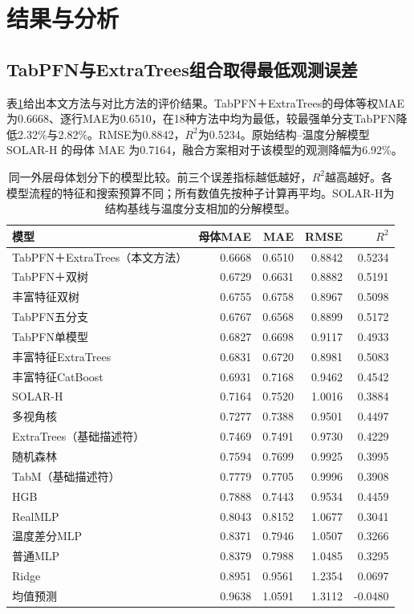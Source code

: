 \section{结果与分析}
\subsection{TabPFN与ExtraTrees组合取得最低观测误差}
表\ref{tab:newcomparison}给出本文方法与对比方法的评价结果。TabPFN＋ExtraTrees的母体等权MAE为0.6668、逐行MAE为0.6510，在18种方法中均为最低，较最强单分支TabPFN降低2.32\%与2.82\%。RMSE为0.8842，$R^2$为0.5234。原始结构--温度分解模型 SOLAR-H 的母体 MAE 为0.7164，融合方案相对于该模型的观测降幅为6.92\%。

\begin{table}[htbp]\centering\small
\caption{同一外层母体划分下的模型比较。前三个误差指标越低越好，$R^2$越高越好。各模型流程的特征和搜索预算不同；所有数值先按种子计算再平均。SOLAR-H为结构基线与温度分支相加的分解模型。}\label{tab:newcomparison}
\begin{tabular}{lrrrr}\toprule
模型 & 母体MAE & MAE & RMSE & $R^2$\\\midrule
TabPFN＋ExtraTrees（本文方法） & 0.6668 & 0.6510 & 0.8842 & 0.5234\\
TabPFN＋双树 & 0.6729 & 0.6631 & 0.8882 & 0.5191\\
丰富特征双树 & 0.6755 & 0.6758 & 0.8967 & 0.5098\\
TabPFN五分支 & 0.6767 & 0.6568 & 0.8899 & 0.5172\\
TabPFN单模型 & 0.6827 & 0.6698 & 0.9117 & 0.4933\\
丰富特征ExtraTrees & 0.6831 & 0.6720 & 0.8981 & 0.5083\\
丰富特征CatBoost & 0.6931 & 0.7168 & 0.9462 & 0.4542\\
SOLAR-H & 0.7164 & 0.7520 & 1.0016 & 0.3884\\
多视角核 & 0.7277 & 0.7388 & 0.9501 & 0.4497\\
ExtraTrees（基础描述符） & 0.7469 & 0.7491 & 0.9730 & 0.4229\\
随机森林 & 0.7594 & 0.7699 & 0.9925 & 0.3995\\
TabM（基础描述符） & 0.7779 & 0.7705 & 0.9996 & 0.3908\\
HGB & 0.7888 & 0.7443 & 0.9534 & 0.4459\\
RealMLP & 0.8043 & 0.8152 & 1.0677 & 0.3041\\
温度差分MLP & 0.8371 & 0.7946 & 1.0507 & 0.3266\\
普通MLP & 0.8379 & 0.7988 & 1.0485 & 0.3295\\
Ridge & 0.8951 & 0.9561 & 1.2354 & 0.0697\\
均值预测 & 0.9638 & 1.0591 & 1.3112 & -0.0480\\
\bottomrule\end{tabular}\end{table}


